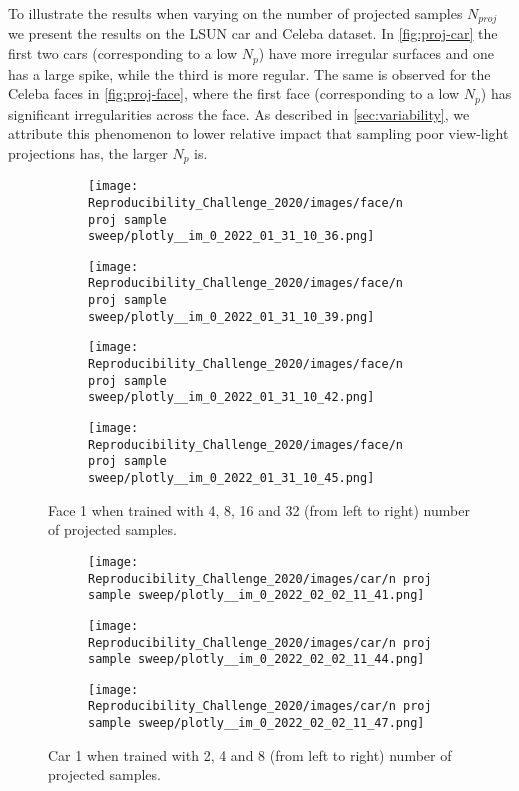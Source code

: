 To illustrate the results when varying on the number of projected samples $N_{proj}$ we present the results on the LSUN car and Celeba dataset. In \autoref{fig:proj-car} the first two cars (corresponding to a low $N_p$) have more irregular surfaces and one has a large spike, while the third is more regular. The same is observed for the Celeba faces in \autoref{fig:proj-face}, where the first face (corresponding to a low $N_p$) has significant irregularities across the face. As described in \autoref{sec:variability}, we attribute this phenomenon to lower relative impact that sampling poor view-light projections has, the larger $N_p$ is. 
\begin{figure}[htb!]
    \centering
    \begin{subfigure}{0.24\textwidth}
        \centering
        \texttt{[image: Reproducibility\_Challenge\_2020/images/face/n proj sample sweep/plotly\_\_im\_0\_2022\_01\_31\_10\_36.png]}
    \end{subfigure}
    \begin{subfigure}{0.24\textwidth}
        \centering
        \texttt{[image: Reproducibility\_Challenge\_2020/images/face/n proj sample sweep/plotly\_\_im\_0\_2022\_01\_31\_10\_39.png]}
    \end{subfigure}
    \begin{subfigure}{0.24\textwidth}
        \centering
        \texttt{[image: Reproducibility\_Challenge\_2020/images/face/n proj sample sweep/plotly\_\_im\_0\_2022\_01\_31\_10\_42.png]}
    \end{subfigure}
    \begin{subfigure}{0.24\textwidth}
        \centering
        \texttt{[image: Reproducibility\_Challenge\_2020/images/face/n proj sample sweep/plotly\_\_im\_0\_2022\_01\_31\_10\_45.png]}
    \end{subfigure}
    \caption{Face 1 when trained with 4, 8, 16 and 32 (from left to right) number of projected samples.}
    \label{fig:proj-face}
\end{figure}


\begin{figure}
    \centering
    \begin{subfigure}{0.32\textwidth}
        \centering
        \texttt{[image: Reproducibility\_Challenge\_2020/images/car/n proj sample sweep/plotly\_\_im\_0\_2022\_02\_02\_11\_41.png]}
    \end{subfigure}
    \begin{subfigure}{0.32\textwidth}
        \centering
        \texttt{[image: Reproducibility\_Challenge\_2020/images/car/n proj sample sweep/plotly\_\_im\_0\_2022\_02\_02\_11\_44.png]}
    \end{subfigure}
    \begin{subfigure}{0.32\textwidth}
        \centering
        \texttt{[image: Reproducibility\_Challenge\_2020/images/car/n proj sample sweep/plotly\_\_im\_0\_2022\_02\_02\_11\_47.png]}
    \end{subfigure}
    \caption{Car 1 when trained with 2, 4 and 8 (from left to right) number of projected samples.}
    \label{fig:proj-car}
\end{figure}
